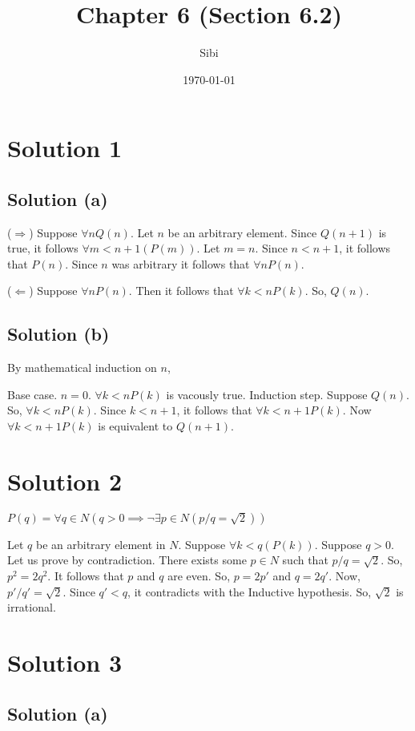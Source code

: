 \documentclass{article}
\begin{document}
\title{Chapter 6 (Section 6.2)}
\author{Sibi}
\date{\today}
\maketitle

\DeclarePairedDelimiter\abs{\lvert}{\rvert}%
\DeclarePairedDelimiter\norm{\lVert}{\rVert}%

\makeatletter
\let\oldabs\abs
\def\abs{\@ifstar{\oldabs}{\oldabs*}}
%
\let\oldnorm\norm
\def\norm{\@ifstar{\oldnorm}{\oldnorm*}}
\makeatother
\newpage

\section{Solution 1}

\subsection{Solution (a)}

($\Rightarrow$) Suppose $\forall n Q(n)$. Let $n$ be an arbitrary element. Since $Q(n+1)$ is true, it follows $\forall m < n + 1(P(m))$. Let $m = n$. Since $n < n + 1$, it follows that $P(n)$. Since $n$ was arbitrary it follows that $\forall n P(n)$.

($\Leftarrow$) Suppose $\forall n P(n)$. Then it follows that $\forall k < n P(k)$. So, $Q(n)$.

\subsection{Solution (b)}

By mathematical induction on $n$,

Base case. $n = 0$. $\forall k < n P(k)$ is vacously true.
Induction step. Suppose $Q(n)$. So, $\forall k < n P(k)$. Since $k < n + 1$, it follows that $\forall k < n + 1 P(k)$. Now $\forall k < n + 1 P(k)$ is equivalent to $Q(n + 1)$.

\section{Solution 2}
$P(q) = \forall q \in N (q > 0 \implies \neg \exists p \in N(p/q = \sqrt{2}))$

Let $q$ be an arbitrary element in $N$. Suppose $\forall k < q(P(k))$. Suppose $q > 0$. Let us prove by contradiction. There exists some $p \in N$ such that $p/q = \sqrt{2}$. So, $p^2 = 2q^2$. It follows that $p$ and $q$ are even. So, $p = 2p'$ and $q = 2q'$. Now, $p'/q' = \sqrt{2}$. Since $q' < q$, it contradicts with the Inductive hypothesis. So, $\sqrt{2}$ is irrational.

\section{Solution 3}
\subsection{Solution (a)}
\end{document}
